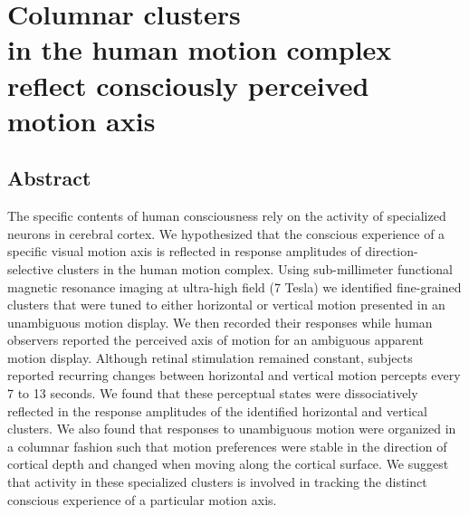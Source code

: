 \chapter[Columnar clusters in the human motion complex reflect consciously perceived motion axis]{Columnar clusters\\ in the human motion complex\\ reflect consciously perceived\\ motion axis}

\clearpage{\thispagestyle{empty}\cleardoublepage}

\section{Abstract}
The specific contents of human consciousness rely on the activity of specialized neurons in cerebral cortex. We hypothesized that the conscious experience of a specific visual motion axis is reflected in response amplitudes of direction-selective clusters in the human motion complex. Using sub-millimeter functional magnetic resonance imaging at ultra-high field (7 Tesla) we identified fine-grained clusters that were tuned to either horizontal or vertical motion presented in an unambiguous motion display. We then recorded their responses while human observers reported the perceived axis of motion for an ambiguous apparent motion display. Although retinal stimulation remained constant, subjects reported recurring changes between horizontal and vertical motion percepts every 7 to 13 seconds. We found that these perceptual states were dissociatively reflected in the response amplitudes of the identified horizontal and vertical clusters. We also found that responses to unambiguous motion were organized in a columnar fashion such that motion preferences were stable in the direction of cortical depth and changed when moving along the cortical surface. We suggest that activity in these specialized clusters is involved in tracking the distinct conscious experience of a particular motion axis.


